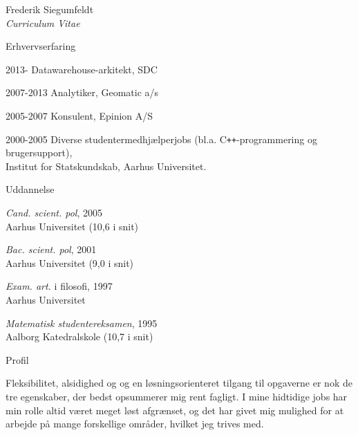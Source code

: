 \documentclass[a4paper]{article}
\begin{document}
 

\setlength{\cvlabelwidth}{35mm}

\begin{cv}{Frederik Siegumfeldt\\{\large \itshape Curriculum Vitae}}

\begin{cvlist}{Erhvervserfaring}

  \item[2013-]       Datawarehouse-arkitekt, SDC

  \item[2007-2013]   Analytiker, Geomatic a/s
      
  \item[2005-2007]   Konsulent, Epinion A/S
      
  \item[2000-2005]   Diverse studentermedhjælperjobs (bl.a. 
                     C{}\verb!++!-programmering og brugersupport), \\ 
                     Institut for Statskundskab, Aarhus Universitet.

\end{cvlist}

\begin{cvlist}{Uddannelse}          

  \item \emph{Cand. scient. pol}, 2005 \\
    Aarhus Universitet (10,6 i snit) 
    
  \item \emph{Bac. scient. pol}, 2001 \\
    Aarhus Universitet (9,0 i snit) 
    
  \item \emph{Exam. art.} i filosofi, 1997 \\
    Aarhus Universitet

  \item \emph{Matematisk studentereksamen}, 1995 \\
    Aalborg Katedralskole (10,7 i snit)

\end{cvlist}

\begin{cvlist}{Profil}

  \item

    Fleksibilitet, alsidighed og og en løsningsorienteret tilgang til 
    opgaverne er nok de tre egenskaber, der bedst opsummerer mig rent 
    fagligt. I mine hidtidige jobs har min rolle altid været meget løst 
    afgrænset, og det har givet mig mulighed for at arbejde på mange 
    forskellige områder, hvilket jeg trives med.


\end{cvlist}
\end{cv}
\end{document}
